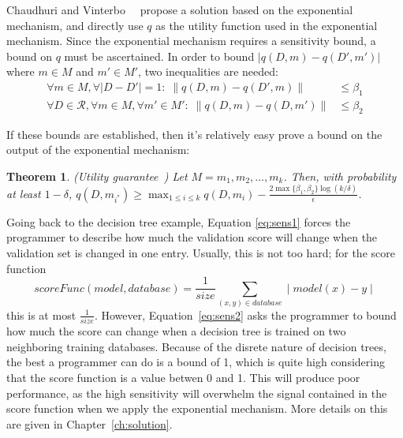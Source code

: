 \documentclass[11pt]{report}
\newtheorem{theorem}{Theorem}
\begin{document}
Chaudhuri and Vinterbo~\cite{Chaudhuri:2013}~\cite{Chaudhuri:2014} propose a solution based on the exponential mechanism, and directly use $q$ as the utility function used in the exponential mechanism. Since the exponential mechanism requires a sensitivity bound, a bound on $q$ must be ascertained. In order to bound $|q(D, m) - q(D', m')|$ where $m \in M$ and $m' \in M'$, two inequalities are needed:
\begin{align}
\forall m\in M,\forall |D-D'|=1:\;\|q(D, m) - q(D', m)\| &\leq \beta_1 \label{eq:sens1} \\
\forall D\in \mathcal{R},\forall m \in M,\forall m'\in M':\;\|q(D, m) -  q(D, m')\| &\leq \beta_2 \label{eq:sens2}
\end{align}

If these bounds are established, then it's relatively easy prove a bound on the output of the exponential mechanism:
\begin{theorem}\label{thm:dependent_exp}
(Utility guarantee~\cite{Chaudhuri:2013}) Let $M = m_1, m_2, \ldots, m_k$. Then, with probability at least $1-\delta$, $q(D, m_{i^*}) \geq \max_{1\leq i \leq k} q(D, m_i) - \frac{2\max\{\beta_1, \beta_2\}\log(k/\delta)}{\epsilon}$.
\end{theorem}

Going back to the decision tree example, Equation \ref{eq:sens1} forces the programmer to describe how much the validation score will change when the validation set is changed in one entry. Usually, this is not too hard; for the score function
\[
scoreFunc(model, database) = \frac{1}{size}\sum_{(x, y) \in database} \mid model(x) - y\mid
\]
this is at most $\frac{1}{size}$. However, Equation~\ref{eq:sens2} asks the programmer to bound how much the score can change when a decision tree is trained on two neighboring training databases. Because of the disrete nature of decision trees, the best a programmer can do is a bound of 1, which is quite high considering that the score function is a value betwen 0 and 1. This will produce poor performance, as the high sensitivity will overwhelm the signal contained in the score function when we apply the exponential mechanism. More details on this are given in Chapter~\ref{ch:solution}.
\end{document}

